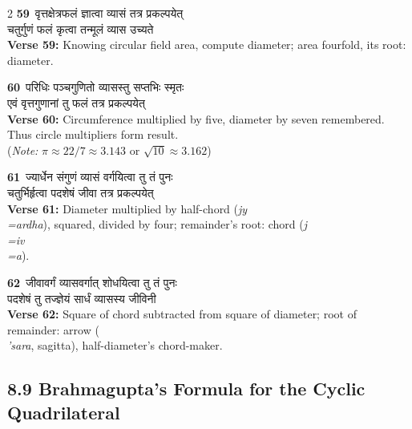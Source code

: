 \documentclass[11pt,a4paper]{article}
\newcommand{\dev}[1]{{\devanagarifont #1}}
\newcommand{\iast}[1]{\textit{#1}}
\newcommand{\vnum}[1]{\textcolor{versenumbercolor}{\textbf{#1}}}
\begin{document}
\begin{paracol}{2}
\switchcolumn[0]
\vnum{59}\ \dev{वृत्तक्षेत्रफलं ज्ञात्वा व्यासं तत्र प्रकल्पयेत्}\\
\dev{चतुर्गुणं फलं कृत्वा तन्मूलं व्यास उच्यते}\\
\switchcolumn[1]
\textbf{Verse 59:} Knowing circular field area, compute diameter; area fourfold, its root: diameter.

\switchcolumn[0]
\vnum{60}\ \dev{परिधिः पञ्चगुणितो व्यासस्तु सप्तभिः स्मृतः}\\
\dev{एवं वृत्तगुणानां तु फलं तत्र प्रकल्पयेत्}\\
\switchcolumn[1]
\textbf{Verse 60:} Circumference multiplied by five, diameter by seven remembered. Thus circle multipliers form result.\\
(\textit{Note:} $\pi \approx 22/7 \approx 3.143$ or $\sqrt{10} \approx 3.162$)

\switchcolumn[0]
\vnum{61}\ \dev{ज्यार्धेन संगुणं व्यासं वर्गयित्वा तु तं पुनः}\\
\dev{चतुर्भिर्हृत्वा पदशेषं जीवा तत्र प्रकल्पयेत्}\\
\switchcolumn[1]
\textbf{Verse 61:} Diameter multiplied by half-chord (\iast{jy\\=ardha}), squared, divided by four; remainder's root: chord (\iast{j\\=iv\\=a}).

\switchcolumn[0]
\vnum{62}\ \dev{जीवावर्गं व्यासवर्गात् शोधयित्वा तु तं पुनः}\\
\dev{पदशेषं तु तज्ज्ञेयं सार्धं व्यासस्य जीविनी}\\
\switchcolumn[1]
\textbf{Verse 62:} Square of chord subtracted from square of diameter; root of remainder: arrow (\iast{\\'sara}, sagitta), half-diameter's chord-maker.

\end{paracol}

\subsection*{8.9 Brahmagupta's Formula for the Cyclic Quadrilateral}
\label{sec:8.9}
\end{document}
